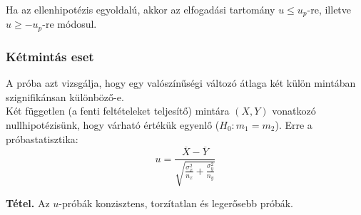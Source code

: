 \documentclass[tikz,12pt,margin=0px]{article}
\newcommand\ddfrac[2]{\frac{\displaystyle #1}{\displaystyle #2}}
\begin{document}
    \noindent Ha az ellenhipotézis egyoldalú, akkor az elfogadási tartomány $u \leq u_p$-re, illetve $u \geq -u_p$-re módosul.\\

    \subsubsection*{Kétmintás eset}

    \noindent A próba azt vizsgálja, hogy egy valószínűségi változó átlaga két külön mintában szignifikánsan különböző-e.\\

    \noindent Két független (a fenti feltételeket teljesítő) mintára $(X, Y)$ vonatkozó nullhipotézisünk, hogy várható értékük egyenlő ($H_0 : m_1 = m_2$). Erre a próbastatisztika:
    \[
        u = \ddfrac{\overline{X} - \overline{Y}}{\sqrt{\ddfrac{\sigma_{x}^{2}}{n_x} + \ddfrac{\sigma_{y}^{2}}{{n_y}}}}
    \]

    \noindent \textbf{Tétel.} Az $u$-próbák konzisztens, torzítatlan és legerősebb próbák.\\
\end{document}
